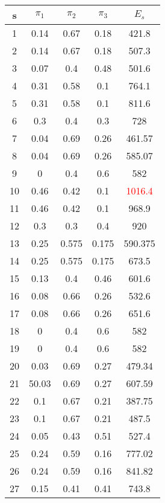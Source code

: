 \documentclass[14pt,a4paper,report]{report}
\begin{document}
	 \begin{tabular}{| c | c | c | c | c | }
	\hline	 
	s & $\pi_1$ & $\pi_2$ & $\pi_3$ & $E_s$\\ \hline
	1 & 0.14 & 0.67 & 0.18   & 421.8\\ \hline
	2 & 0.14 & 0.67 & 0.18 & 507.3\\ \hline
	3 & 0.07 & 0.4 & 0.48 & 501.6\\ \hline
	
	4 & 0.31 & 0.58 & 0.1 & 764.1\\ \hline
	5 & 0.31 & 0.58 & 0.1 & 811.6\\ \hline
	6 & 0.3 & 0.4 & 0.3 & 728\\ \hline
	
	7 & 0.04 & 0.69 & 0.26 & 461.57\\ \hline
	8 & 0.04 & 0.69 & 0.26 & 585.07\\ \hline
	9 & 0 & 0.4 & 0.6 & 582\\ \hline
	
	10 & 0.46 & 0.42 & 0.1 & \textcolor{red}{1016.4}\\ \hline
	11 & 0.46 & 0.42 & 0.1 & 968.9\\ \hline
	12 & 0.3 & 0.3 & 0.4 & 920\\ \hline
	
	13 & 0.25 & 0.575 & 0.175 & 590.375\\ \hline
	14 & 0.25 & 0.575 & 0.175 & 673.5\\ \hline
	15 & 0.13 & 0.4 & 0.46 & 601.6\\ \hline
	
	16 & 0.08 & 0.66 & 0.26 & 532.6\\ \hline
	17 & 0.08 & 0.66 & 0.26 & 651.6\\ \hline
	18 & 0 & 0.4 & 0.6 & 582\\ \hline
	
	19 & 0 & 0.4 & 0.6 & 582\\ \hline
	20 & 0.03 & 0.69 & 0.27 & 479.34\\ \hline
	21 & 50.03 & 0.69 & 0.27 & 607.59\\ \hline
	
	22 & 0.1 & 0.67 & 0.21 & 387.75\\ \hline
	23 & 0.1 & 0.67 & 0.21 & 487.5\\ \hline
	24 & 0.05 & 0.43 & 0.51 & 527.4\\ \hline
	
	25 & 0.24 & 0.59 & 0.16 & 777.02\\ \hline
	26 & 0.24 & 0.59 & 0.16 & 841.82\\ \hline
	27 & 0.15 & 0.41 & 0.41 & 743.8\\ \hline
	\end{tabular}
	
\end{document}
